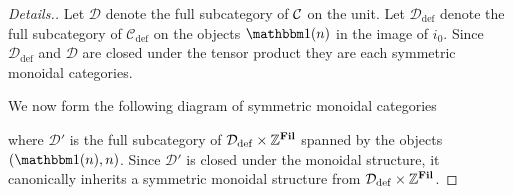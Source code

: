 \begin{proof}[Details.]
  Let $\mathcal{D}$ denote the full subcategory of $\mathcal{C}$ on the unit.
  Let $\mathcal{D}_{\mathrm{def}}$ denote the full subcategory of $\mathcal{C}_{\mathrm{def}}$ on the objects $\o(n)$ in the image of $i_0$.
  Since $\mathcal{D}_{\mathrm{def}}$ and $\mathcal{D}$ are closed under the tensor product they are each symmetric monoidal categories.
 


  We now form the following diagram of symmetric monoidal categories
  \begin{center}  \end{center}
  where %
  $\mathcal{D}'$ is the full subcategory of $\mathcal{D}_{\mathrm{def}} \times \mathbb{Z}^{\operatorname{\mathbf{Fil}}}$ spanned by the objects $(\o(n),n)$. Since $\mathcal{D}'$ is closed under the monoidal structure, it canonically inherits a symmetric monoidal structure from $\mathcal{D}_{\mathrm{def}} \times \mathbb{Z}^{\operatorname{\mathbf{Fil}}}$.


\end{proof}
